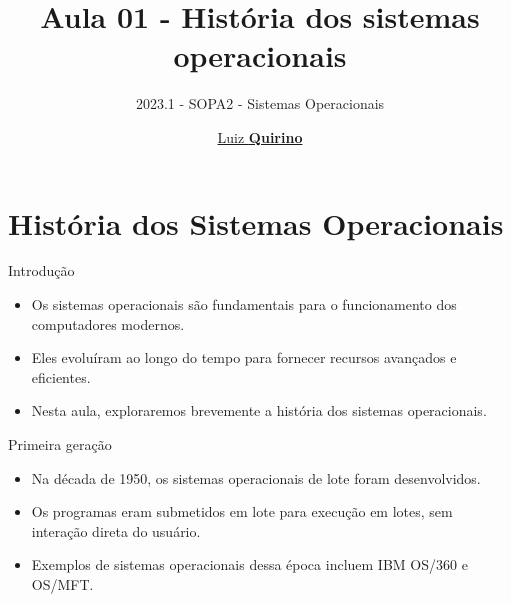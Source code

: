 \documentclass{beamer}
\title{Aula 01 - História dos sistemas operacionais}
\subtitle{2023.1 - SOPA2 - Sistemas Operacionais}
\author{\href{mailto:luizfpq@gmail.com}{Luiz \textbf{Quirino}}}
\newcommand{\hrefcol}[2]{\textcolor{cyan}{\href{#1}{#2}}}
\begin{document}
\maketitle

%
%




\section{História dos Sistemas Operacionais}

\begin{frame}{Introdução}
      \begin{itemize}
            \item Os sistemas operacionais são fundamentais para o funcionamento dos computadores modernos.
            \item Eles evoluíram ao longo do tempo para fornecer recursos avançados e eficientes.
            \item Nesta aula, exploraremos brevemente a história dos sistemas operacionais.
          \end{itemize}

\end{frame}

\begin{frame}{Primeira geração}
      \begin{itemize}
            \item Na década de 1950, os sistemas operacionais de lote foram desenvolvidos.
            \item Os programas eram submetidos em lote para execução em lotes, sem interação direta do usuário.
            \item Exemplos de sistemas operacionais dessa época incluem IBM OS/360 e OS/MFT.
          \end{itemize}
\end{frame}
            
\end{document}
